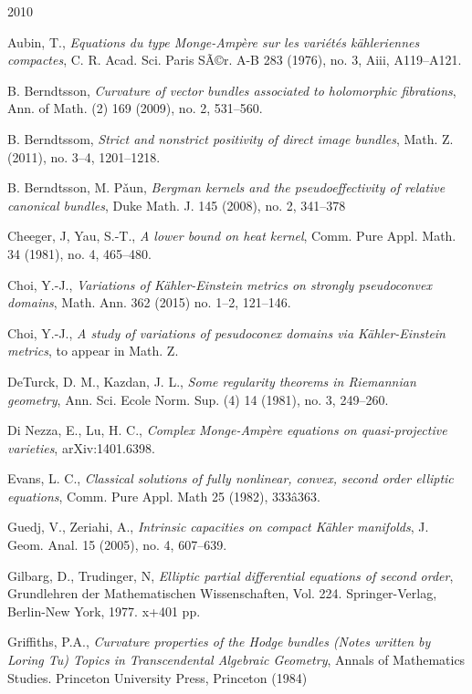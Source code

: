 \documentclass{amsart}
\theoremstyle{definition}
\numberwithin{equation}{section}
\begin{document}
\begin{thebibliography} {2010}

 Aubin, T., \emph{Equations du type Monge-Amp\`ere sur les vari\'et\'es k\"ahleriennes compactes}, C. R. Acad. Sci. Paris SÃ©r. A-B 283 (1976), no. 3, Aiii, A119--A121.

 B. Berndtsson, \emph{Curvature of vector bundles associated to holomorphic fibrations}, Ann. of Math. (2) 169 (2009), no. 2, 531--560.

 B. Berndtssom, \emph{Strict and nonstrict positivity of direct image bundles}, Math. Z. (2011), no. 3--4, 1201--1218.

  B. Berndtsson, M. P\v{a}un, \emph{Bergman kernels and the pseudoeffectivity of relative canonical bundles}, Duke Math. J. 145 (2008), no. 2, 341--378

 Cheeger, J, Yau, S.-T., \emph{A lower bound on heat kernel}, Comm. Pure Appl. Math. 34 (1981), no. 4, 465--480. 

 Choi, Y.-J., \emph{Variations of K\"ahler-Einstein metrics on strongly pseudoconvex domains}, Math. Ann. 362 (2015) no. 1--2, 121--146.

 Choi, Y.-J., \emph{A study of variations of pesudoconex domains via K\"ahler-Einstein metrics}, to appear in Math. Z.

 DeTurck, D. M., Kazdan, J. L., \emph{Some regularity theorems in Riemannian geometry}, Ann. Sci. Ecole Norm. Sup. (4) 14 (1981), no. 3, 249--260.

 Di Nezza, E., Lu, H. C., \emph{Complex Monge-Amp\`ere equations on quasi-projective varieties}, arXiv:1401.6398.

 Evans, L. C., 
\emph{Classical solutions of fully nonlinear, convex, second order elliptic equations},
Comm. Pure Appl. Math 25 (1982), 333â363.

 Guedj, V., Zeriahi, A., \emph{Intrinsic capacities on compact K\"ahler manifolds}, J. Geom. Anal. 15 (2005), no. 4, 607--639. 

 Gilbarg, D., Trudinger, N, \emph{Elliptic partial differential equations of second order}, Grundlehren der Mathematischen Wissenschaften, Vol. 224. Springer-Verlag, Berlin-New York, 1977. x+401 pp.

  Griffiths, P.A., \emph{Curvature properties of the Hodge bundles (Notes written by Loring Tu) Topics in Transcendental Algebraic Geometry}, Annals of Mathematics Studies. Princeton University Press, Princeton (1984)


\end{thebibliography}
\end{document}
